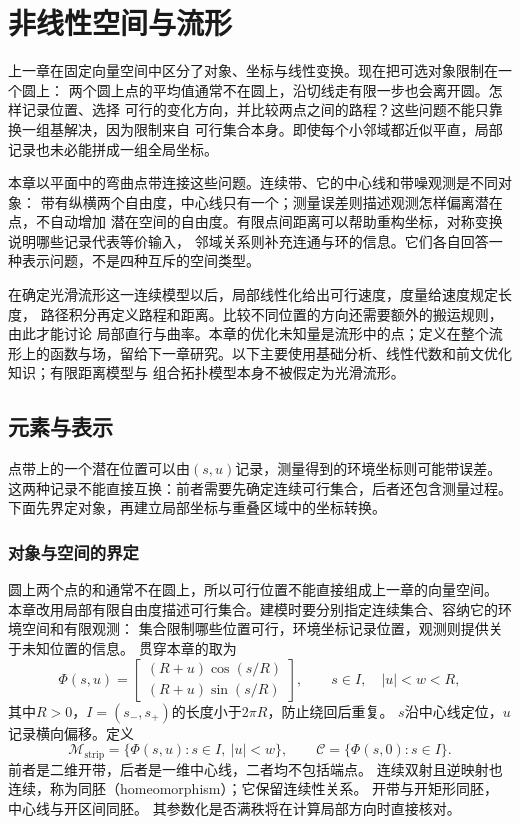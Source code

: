 \chapter{非线性空间与流形}
\label{chap:differential-geometry-and-symmetry}

上一章在固定向量空间中区分了对象、坐标与线性变换。现在把可选对象限制在一个圆上：
两个圆上点的平均值通常不在圆上，沿切线走有限一步也会离开圆。怎样记录位置、选择
可行的变化方向，并比较两点之间的路程？这些问题不能只靠换一组基解决，因为限制来自
可行集合本身。即使每个小邻域都近似平直，局部记录也未必能拼成一组全局坐标。

本章以平面中的弯曲点带连接这些问题。连续带、它的中心线和带噪观测是不同对象：
带有纵横两个自由度，中心线只有一个；测量误差则描述观测怎样偏离潜在点，不自动增加
潜在空间的自由度。有限点间距离可以帮助重构坐标，对称变换说明哪些记录代表等价输入，
邻域关系则补充连通与环的信息。它们各自回答一种表示问题，不是四种互斥的空间类型。

在确定光滑流形这一连续模型以后，局部线性化给出可行速度，度量给速度规定长度，
路径积分再定义路程和距离。比较不同位置的方向还需要额外的搬运规则，由此才能讨论
局部直行与曲率。本章的优化未知量是流形中的点；定义在整个流形上的函数与场，留给下一章研究。以下主要使用基础分析、线性代数和前文优化知识；有限距离模型与
组合拓扑模型本身不被假定为光滑流形。

\section{元素与表示}
\label{sec:geometry-nonlinear-representations}

点带上的一个潜在位置可以由$(s,u)$记录，测量得到的环境坐标则可能带误差。
这两种记录不能直接互换：前者需要先确定连续可行集合，后者还包含测量过程。
下面先界定对象，再建立局部坐标与重叠区域中的坐标转换。

\subsection{对象与空间的界定}
\label{sec:geometry-objects}

圆上两个点的和通常不在圆上，所以可行位置不能直接组成上一章的向量空间。
本章改用局部有限自由度描述可行集合。建模时要分别指定连续集合、容纳它的环境空间和有限观测：
集合限制哪些位置可行，环境坐标记录位置，观测则提供关于未知位置的信息。
贯穿本章的取为
\begin{equation}
 \Phi(s,u)=
 \begin{bmatrix}
 (R+u)\cos(s/R)\\(R+u)\sin(s/R)
 \end{bmatrix},
 \qquad s\in I,\quad |u|<w<R,
 \label{eq:geometry-curved-strip-parameterization}
\end{equation}
其中$R>0$，$I=(s_-,s_+)$的长度小于$2\pi R$，防止绕回后重复。
$s$沿中心线定位，$u$记录横向偏移。定义
\[
 \mathcal M_{\mathrm{strip}}=\{\Phi(s,u):s\in I,\ |u|<w\},
 \qquad \mathcal C=\{\Phi(s,0):s\in I\}.
\]
前者是二维开带，后者是一维中心线，二者均不包括端点。
连续双射且逆映射也连续，称为同胚（homeomorphism）；它保留连续性关系。
开带与开矩形同胚，中心线与开区间同胚。
其参数化是否满秩将在计算局部方向时直接核对。

